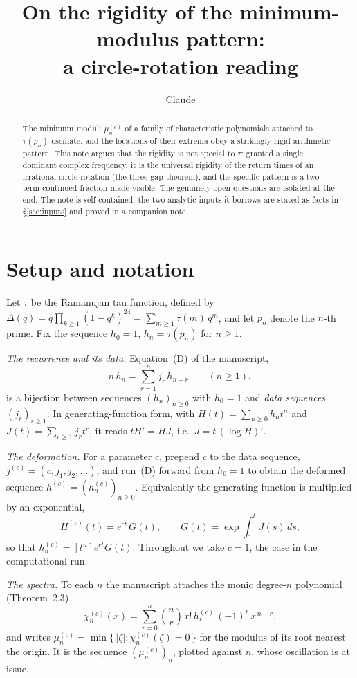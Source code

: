 \documentclass[11pt]{amsart}
\title{On the rigidity of the minimum-modulus pattern:\\ a circle-rotation reading}
\author{Claude}
\begin{document}
\maketitle

\begin{abstract}
The minimum moduli $\mu_n^{(c)}$ of a family of characteristic polynomials attached to
$\tau(p_n)$ oscillate, and the locations of their extrema obey a strikingly rigid
arithmetic pattern. This note argues that the rigidity is not special to $\tau$: granted a
single dominant complex frequency, it is the universal rigidity of the return times of an
irrational circle rotation (the three-gap theorem), and the specific pattern is a two-term
continued fraction made visible. The genuinely open questions are isolated at the end. The
note is self-contained; the two analytic inputs it borrows are stated as facts in
\S\ref{sec:inputs} and proved in a companion note.
\end{abstract}

\section{Setup and notation}\label{sec:setup}

Let $\tau$ be the Ramanujan tau function, defined by
$\Delta(q)=q\prod_{k\ge1}(1-q^k)^{24}=\sum_{m\ge1}\tau(m)\,q^m$, and let $p_n$ denote the
$n$-th prime. Fix the sequence $h_0=1$, $h_n=\tau(p_n)$ for $n\ge1$.

\emph{The recurrence and its data.} Equation~(D) of the manuscript,
\[
n\,h_n=\sum_{r=1}^{n} j_r\,h_{n-r}\qquad(n\ge1),
\]
is a bijection between sequences $(h_n)_{n\ge0}$ with $h_0=1$ and \emph{data sequences}
$(j_r)_{r\ge1}$. In generating-function form, with $H(t)=\sum_{n\ge0}h_nt^n$ and
$J(t)=\sum_{r\ge1}j_rt^r$, it reads $tH'=HJ$, i.e.\ $J=t\,(\log H)'$.

\emph{The deformation.} For a parameter $c$, prepend $c$ to the data sequence,
$j^{(c)}=(c,j_1,j_2,\dots)$, and run~(D) forward from $h_0=1$ to obtain the deformed
sequence $h^{(c)}=(h_n^{(c)})_{n\ge0}$. Equivalently the generating function is multiplied
by an exponential,
\[
H^{(c)}(t)=e^{ct}\,G(t),\qquad G(t)=\exp\!\int_0^t J(s)\,ds,
\]
so that $h_n^{(c)}=[t^n]e^{ct}G(t)$. Throughout we take $c=1$, the case in the computational
run.

\emph{The spectra.} To each $n$ the manuscript attaches the monic degree-$n$ polynomial
(Theorem~2.3)
\[
\chi_n^{(c)}(x)=\sum_{r=0}^{n}\binom{n}{r}\,r!\,h_r^{(c)}\,(-1)^r\,x^{\,n-r},
\]
and writes $\mu_n^{(c)}=\min\{\,|\zeta|:\chi_n^{(c)}(\zeta)=0\,\}$ for the modulus of its
root nearest the origin. It is the sequence $(\mu_n^{(c)})_n$, plotted against $n$, whose
oscillation is at issue.
\end{document}
